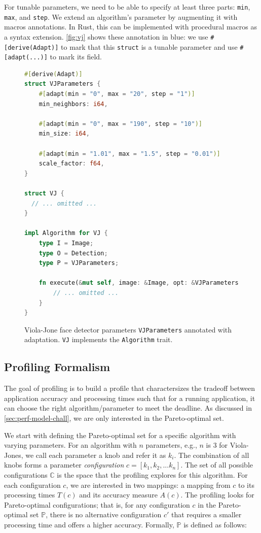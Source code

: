 For tunable parameters, we need to be able to specify at least three parts:
\texttt{min}, \texttt{max}, and \texttt{step}. We extend an algorithm's
parameter by augmenting it with macros annotations. In Rust, this can be
implemented with procedural macros as a syntax extension. \autoref{fig:vj} shows
these annotation in blue: we use \texttt{\#[derive(Adapt)]} to mark that this
\texttt{struct} is a tunable parameter and use \texttt{\#[adapt(...)]} to mark
its field.

\begin{figure}
  \centering
\begin{lstlisting}[language=Rust]
#[derive(Adapt)]
struct VJParameters {
    #[adapt(min = "0", max = "20", step = "1")]
    min_neighbors: i64,

    #[adapt(min = "0", max = "190", step = "10")]
    min_size: i64,

    #[adapt(min = "1.01", max = "1.5", step = "0.01")]
    scale_factor: f64,
}

struct VJ {
  // ... omitted ...
}

impl Algorithm for VJ {
    type I = Image;
    type O = Detection;
    type P = VJParameters;

    fn execute(&mut self, image: &Image, opt: &VJParameters) -> Detection {
        // ... omitted ...
    }
}
\end{lstlisting}
  \caption{Viola-Jone face detector parameters \texttt{VJParameters} annotated
    with adaptation. \texttt{VJ} implements the \texttt{Algorithm} trait.}
  \label{fig:vj}
\end{figure}

\subsection{Profiling Formalism}
\label{sec:profiling-formalism}

The goal of profiling is to build a profile that charactersizes the tradeoff
between application accuracy and processing times such that for a running
application, it can choose the right algorithm/parameter to meet the
deadline. As discussed in \autoref{sec:perf-model-chall}, we are only interested
in the Pareto-optimal set.

We start with defining the Pareto-optimal set for a specific algorithm with
varying parameters. For an algorithm with $n$ parameters, e.g., $n$ is 3 for
Viola-Jones, we call each parameter a knob and refer it as $k_i$. The
combination of all knobs forms a parameter \textit{configuration}
$c = [k_{1}, k_{2}, ... k_{n}]$. The set of all possible configurations
$\mathbb{C}$ is the space that the profiling explores for this algorithm. For
each configuration $c$, we are interested in two mappings: a mapping from $c$ to
its processing times $T(c)$ and its accuracy measure $A(c)$.  The profiling
looks for Pareto-optimal configurations; that is, for any configuration $c$ in
the Pareto-optimal set $\mathbb{P}$, there is no alternative configuration $c'$
that requires a smaller processing time and offers a higher accuracy. Formally,
$\mathbb{P}$ is defined as follows:

